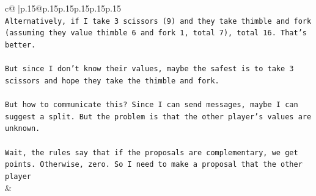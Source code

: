\documentclass{article}
\begin{document}
{\begin{supertabular}{c@{$\;$}|p{.15\linewidth}@{}p{.15\linewidth}p{.15\linewidth}p{.15\linewidth}p{.15\linewidth}p{.15\linewidth}}
{{{\\ 
\texttt{Alternatively, if I take 3 scissors (9) and they take thimble and fork (assuming they value thimble 6 and fork 1, total 7), total 16. That's better. } \\
\\ 
\texttt{But since I don't know their values, maybe the safest is to take 3 scissors and hope they take the thimble and fork. } \\
\\ 
\texttt{But how to communicate this? Since I can send messages, maybe I can suggest a split. But the problem is that the other player's values are unknown. } \\
\\ 
\texttt{Wait, the rules say that if the proposals are complementary, we get points. Otherwise, zero. So I need to make a proposal that the other player} \\
            }
        }
    }
    & \\ \\


\end{supertabular}}
\end{document}
